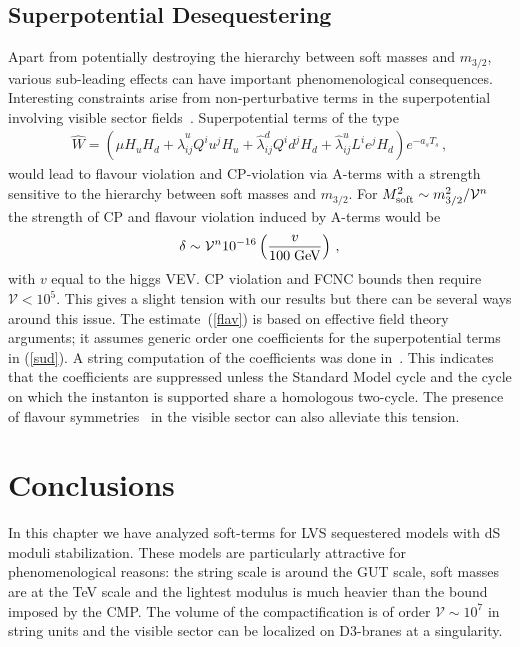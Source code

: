 \documentclass[12pt,a4paper]{book}
\begin{document}
\subsection{Superpotential Desequestering}

Apart from potentially destroying the hierarchy between soft masses and $m_{3/2}$, various sub-leading effects can have important phenomenological consequences. Interesting constraints arise from non-perturbative terms in the superpotential involving visible sector fields~\cite{Berg:2010ha}. Superpotential terms of the type
\begin{align}
\label{sud}
\hat{W} = \left( \hat{\mu} H_u H_d + \hat {\lambda}^u_{ij} Q^i u^j H_u
+ \hat {\lambda}^d_{ij}  Q^i d^j H_d + \hat {\lambda}^u_{ij} L^i e^j H_d \right) e^{-a_s T_s}\,,
\end{align}
would lead to flavour violation and CP-violation via A-terms with a strength sensitive to the hierarchy between soft masses and $m_{3/2}$. For $M_{\rm soft}^2 \sim m_{3/2}^2/\mathcal{V}^n$ the strength of CP and flavour violation induced by A-terms would be
\begin{align}
\label{flav}
\delta \sim  \mathcal{V}^n   10^{-16} \left( {v \over 100 \phantom{.} {\rm GeV}} \right)\,,
\end{align}
with $v$ equal to the higgs VEV. CP violation and FCNC bounds then require $\mathcal{V} < 10^5$. This gives a slight tension with our results but there can be several ways around this issue. The estimate~(\ref{flav}) is based on effective field theory arguments; it assumes generic order one coefficients for the superpotential terms in (\ref{sud}). A string computation of  the coefficients was done in~\cite{Berg:2012aq}. This indicates that the coefficients are suppressed unless the Standard Model cycle and the cycle on which the instanton is supported share a homologous two-cycle. The presence of flavour symmetries~\cite{Conlon:2008wa, Dolan:2011qu, Krippendorf:2010hj, Maharana:2011wx} in the visible sector can also alleviate this tension.

\section{Conclusions}
\label{sec:conclusions}

In this chapter we have analyzed soft-terms for LVS sequestered models with dS moduli stabilization. These models are particularly attractive for phenomenological reasons: the string scale is around the GUT scale, soft masses are at the TeV scale and the lightest modulus is much heavier than the bound imposed by the CMP. The volume of the compactification is of order $\mathcal{V}\sim 10^7$ in string units and the visible sector can be localized on D3-branes at a singularity.\\
\end{document}
